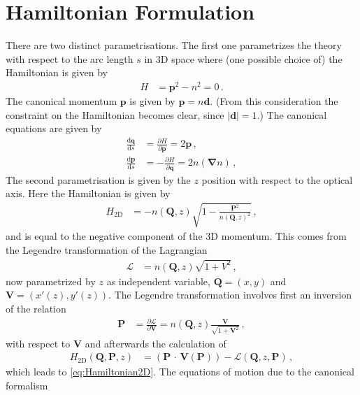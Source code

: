 \documentclass[12pt,a4paper,twoside,openright,BCOR10mm,headsepline,titlepage,abstracton,chapterprefix,final]{scrreprt}
\newcommand\Vector[1]{{\mathbf{#1}}}
\newcommand{\scpm}[2]{(#1\,\cdot\,#2)}
\begin{document}
\section{Hamiltonian Formulation}
There are two distinct parametrisations. The first one parametrizes the theory with respect to the
arc length $s$ in 3D space where (one possible choice of) the Hamiltonian is given by
\begin{align}
 H &= \Vector{p}^2 - n^2 = 0\,.
\end{align}
The canonical momentum $\Vector{p}$ is given by $\Vector{p} = n \Vector{d}$. (From this consideration the constraint on
the Hamiltonian becomes clear, since $|\Vector{d}| = 1$.) The canonical equations are given by
\begin{subequations}
\label{eq:H3Deom}
\begin{align}
 \frac{\text{d}\Vector{q}}{\text{d}s} &= \frac{\partial H}{\partial \Vector{p}} = 2 \Vector{p}\,,\\
 \frac{\text{d}\Vector{p}}{\text{d}s} &= -\frac{\partial H}{\partial \Vector{q}} = 2 n (\Vector{\nabla} n)\,, 
\end{align}
\end{subequations}
The second parametrisation is given by the $z$ position with respect to the optical axis. Here the Hamiltonian is
given by
\begin{align}
 H_{\text{2D}} &= -n(\Vector{Q}, z)\sqrt{1 - \frac{\Vector{P}^2}{n(\Vector{Q}, z)^2}}\label{eq:Hamiltonian2D}\,,
\end{align}
and is equal to the negative component of the 3D momentum.
This comes from the Legendre transformation of the Lagrangian
\begin{align}
 \mathcal{L} &= n(\Vector{Q}, z) \sqrt{1 + V^2}\,,
\end{align}
now parametrized by $z$ as independent variable, $\Vector{Q} = (x,y)$ and $\Vector{V} = (x'(z), y'(z))$.
The Legendre transformation involves first an inversion of the relation
\begin{align}
 \Vector{P} &= \frac{\partial \mathcal{L}}{\partial \Vector{V}} = n(\Vector{Q}, z) \frac{\Vector{V}}{\sqrt{1 + \Vector{V}^2}}\,,
\end{align}
with respect to $\Vector{V}$ and afterwards the calculation of
\begin{align}
 H_{\text{2D}}(\Vector{Q}, \Vector{P},z) &= \scpm{\Vector{P}}{\Vector{V}(\Vector{P})} - \mathcal{L}(\Vector{Q}, z, \Vector{P})\,,
\end{align}
which leads to \eqref{eq:Hamiltonian2D}. The equations of motion due to the canonical formalism 
\end{document}

